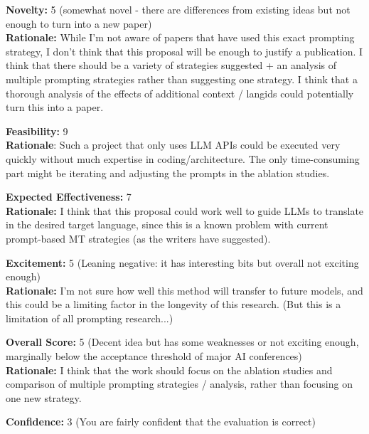 \newpage


\begin{tcolorbox}[colback=green!10!white, colframe=green!80!black, title=\textbf{Reviewer 1}]
\small
\textbf{Novelty:} 5 (somewhat novel - there are differences from existing ideas but not enough to turn into a new paper)\\
\textbf{Rationale:} While I'm not aware of papers that have used this exact prompting strategy, I don't think that this proposal will be enough to justify a publication. I think that there should be a variety of strategies suggested + an analysis of multiple prompting strategies rather than suggesting one strategy. I think that a thorough analysis of the effects of additional context / langids could potentially turn this into a paper.

\vspace{10pt}

\textbf{Feasibility:} 9 \\
\textbf{Rationale}: Such a project that only uses LLM APIs could be executed very quickly without much expertise in coding/architecture. The only time-consuming part might be iterating and adjusting the prompts in the ablation studies. 

\vspace{10pt}

\textbf{Expected Effectiveness:} 7  \\
\textbf{Rationale:} I think that this proposal could work well to guide LLMs to translate in the desired target language, since this is a known problem with current prompt-based MT strategies (as the writers have suggested).

\vspace{10pt}

\textbf{Excitement:} 5 (Leaning negative: it has interesting bits but overall not exciting enough)\\
\textbf{Rationale:} I'm not sure how well this method will transfer to future models, and this could be a limiting factor in the longevity of this research. (But this is a limitation of all prompting research...)

\vspace{10pt}

\textbf{Overall Score:} 5 (Decent idea but has some weaknesses or not exciting enough, marginally below the acceptance threshold of major AI conferences)\\
\textbf{Rationale:} I think that the work should focus on the ablation studies and comparison of multiple prompting strategies / analysis, rather than focusing on one new strategy.

\vspace{10pt}

\textbf{Confidence:} 3 (You are fairly confident that the evaluation is correct)
\end{tcolorbox}

